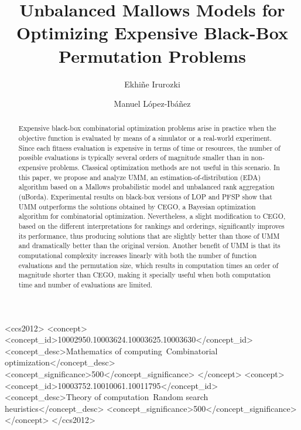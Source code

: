 \documentclass[sigconf,dvipsnames]{acmart}
\begin{document}
\title{Unbalanced Mallows Models for Optimizing Expensive Black-Box Permutation Problems}

\author{Ekhiñe Irurozki}

\author{Manuel López-Ibáñez}

\begin{abstract}
  Expensive black-box combinatorial optimization problems arise in practice
  when the objective function is evaluated by means of a simulator or a
  real-world experiment. Since each fitness evaluation is expensive in terms of
  time or resources, the number of possible evaluations is typically several
  orders of magnitude smaller than in non-expensive problems. Classical
  optimization methods are not useful in this scenario.
  In this paper, we propose and analyze UMM, an estimation-of-distribution
  (EDA) algorithm based on a Mallows probabilistic model and unbalanced rank
  aggregation (uBorda).
  Experimental results on black-box versions of LOP and PFSP show that UMM
  outperforms the solutions obtained by CEGO, a Bayesian optimization algorithm
  for combinatorial optimization. Nevertheless, a slight modification to CEGO,
  based on the different interpretations for rankings and orderings,
  significantly improves its performance, thus producing solutions that are
  slightly better than those of UMM and dramatically better than the original
  version.  Another benefit of UMM is that its computational complexity
  increases linearly with both the number of function evaluations and the
  permutation size, which results in computation times an order of magnitude
  shorter than CEGO, making it specially useful when both computation time and
  number of evaluations are limited.
  \sloppy
\end{abstract}
%
%
\begin{CCSXML}
<ccs2012>
<concept>
<concept_id>10002950.10003624.10003625.10003630</concept_id>
<concept_desc>Mathematics of computing~Combinatorial optimization</concept_desc>
<concept_significance>500</concept_significance>
</concept>
<concept>
<concept_id>10003752.10010061.10011795</concept_id>
<concept_desc>Theory of computation~Random search heuristics</concept_desc>
<concept_significance>500</concept_significance>
</concept>
</ccs2012>
\end{CCSXML}
\end{document}
